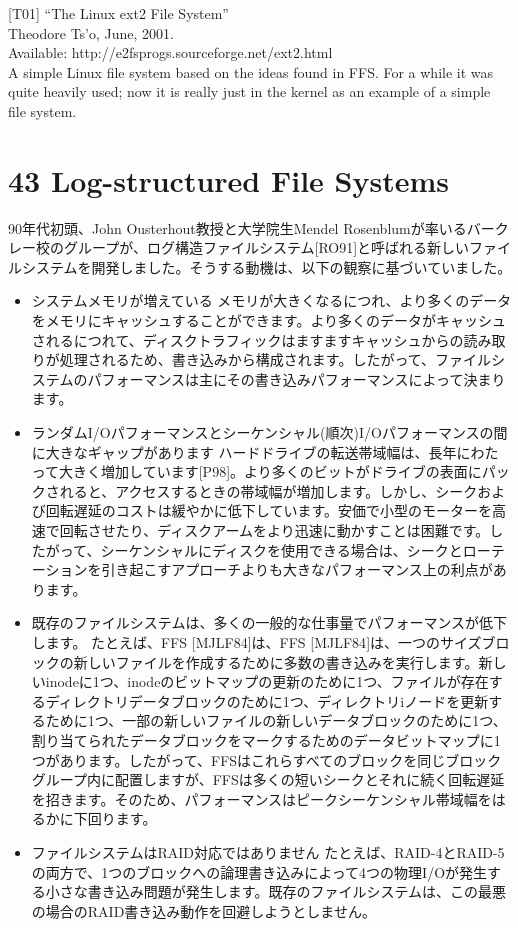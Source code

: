 {[}T01{]} ``The Linux ext2 File System''\\
Theodore Ts'o, June, 2001.\\
Available: http://e2fsprogs.sourceforge.net/ext2.html\\
A simple Linux file system based on the ideas found in FFS. For a while
it was quite heavily used; now it is really just in the kernel as an
example of a simple file system.

\hypertarget{log-structured-file-systems}{%
\section*{43 Log-structured File
Systems}\label{log-structured-file-systems}}

90年代初頭、John Ousterhout教授と大学院生Mendel
Rosenblumが率いるバークレー校のグループが、ログ構造ファイルシステム{[}RO91{]}と呼ばれる新しいファイルシステムを開発しました。そうする動機は、以下の観察に基づいていました。

\begin{itemize}
\item
  システムメモリが増えている
  メモリが大きくなるにつれ、より多くのデータをメモリにキャッシュすることができます。より多くのデータがキャッシュされるにつれて、ディスクトラフィックはますますキャッシュからの読み取りが処理されるため、書き込みから構成されます。したがって、ファイルシステムのパフォーマンスは主にその書き込みパフォーマンスによって決まります。
\item
  ランダムI/Oパフォーマンスとシーケンシャル(順次)I/Oパフォーマンスの間に大きなギャップがあります
  ハードドライブの転送帯域幅は、長年にわたって大きく増加しています{[}P98{]}。より多くのビットがドライブの表面にパックされると、アクセスするときの帯域幅が増加します。しかし、シークおよび回転遅延のコストは緩やかに低下しています。安価で小型のモーターを高速で回転させたり、ディスクアームをより迅速に動かすことは困難です。したがって、シーケンシャルにディスクを使用できる場合は、シークとローテーションを引き起こすアプローチよりも大きなパフォーマンス上の利点があります。
\item
  既存のファイルシステムは、多くの一般的な仕事量でパフォーマンスが低下します。
  たとえば、FFS {[}MJLF84{]}は、FFS
  {[}MJLF84{]}は、一つのサイズブロックの新しいファイルを作成するために多数の書き込みを実行します。新しいinodeに1つ、inodeのビットマップの更新のために1つ、ファイルが存在するディレクトリデータブロックのために1つ、ディレクトリiノードを更新するために1つ、一部の新しいファイルの新しいデータブロックのために1つ、割り当てられたデータブロックをマークするためのデータビットマップに1つがあります。したがって、FFSはこれらすべてのブロックを同じブロックグループ内に配置しますが、FFSは多くの短いシークとそれに続く回転遅延を招きます。そのため、パフォーマンスはピークシーケンシャル帯域幅をはるかに下回ります。
\item
  ファイルシステムはRAID対応ではありません
  たとえば、RAID-4とRAID-5の両方で、1つのブロックへの論理書き込みによって4つの物理I/Oが発生する小さな書き込み問題が発生します。既存のファイルシステムは、この最悪の場合のRAID書き込み動作を回避しようとしません。
\end{itemize}

